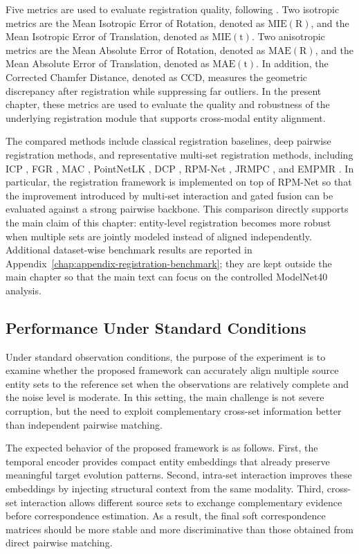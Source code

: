 Five metrics are used to evaluate registration quality, following \cite{yew2020rpmnet,wang2019dcp}. Two isotropic metrics are the Mean Isotropic Error of Rotation, denoted as \(\mathrm{MIE(R)}\), and the Mean Isotropic Error of Translation, denoted as \(\mathrm{MIE(t)}\). Two anisotropic metrics are the Mean Absolute Error of Rotation, denoted as \(\mathrm{MAE(R)}\), and the Mean Absolute Error of Translation, denoted as \(\mathrm{MAE(t)}\). In addition, the Corrected Chamfer Distance, denoted as \(\mathrm{CCD}\), measures the geometric discrepancy after registration while suppressing far outliers. In the present chapter, these metrics are used to evaluate the quality and robustness of the underlying registration module that supports cross-modal entity alignment.

The compared methods include classical registration baselines, deep pairwise registration methods, and representative multi-set registration methods, including ICP \cite{besl1992icp}, FGR \cite{zhou2016fgr}, MAC \cite{zhang2023mac}, PointNetLK \cite{aoki2019pointnetlk}, DCP \cite{wang2019dcp}, RPM-Net \cite{yew2020rpmnet}, JRMPC \cite{evangelidis2018joint}, and EMPMR \cite{zhu2020multiviewem}. In particular, the registration framework is implemented on top of RPM-Net \cite{yew2020rpmnet} so that the improvement introduced by multi-set interaction and gated fusion can be evaluated against a strong pairwise backbone. This comparison directly supports the main claim of this chapter: entity-level registration becomes more robust when multiple sets are jointly modeled instead of aligned independently. Additional dataset-wise benchmark results are reported in Appendix~\ref{chap:appendix-registration-benchmark}; they are kept outside the main chapter so that the main text can focus on the controlled ModelNet40 analysis.

\subsection{Performance Under Standard Conditions}
Under standard observation conditions, the purpose of the experiment is to examine whether the proposed framework can accurately align multiple source entity sets to the reference set when the observations are relatively complete and the noise level is moderate. In this setting, the main challenge is not severe corruption, but the need to exploit complementary cross-set information better than independent pairwise matching.

The expected behavior of the proposed framework is as follows. First, the temporal encoder provides compact entity embeddings that already preserve meaningful target evolution patterns. Second, intra-set interaction improves these embeddings by injecting structural context from the same modality. Third, cross-set interaction allows different source sets to exchange complementary evidence before correspondence estimation. As a result, the final soft correspondence matrices should be more stable and more discriminative than those obtained from direct pairwise matching.

